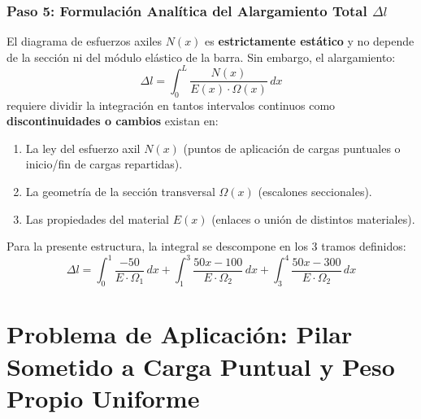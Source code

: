 \subsubsection*{Paso 5: Formulación Analítica del Alargamiento Total $\Delta l$}
\begin{ImportanteBox}[title={Regla Fundamental: Segmentación de la Integral de Deformación}]
    El diagrama de esfuerzos axiles $N(x)$ es \textbf{estrictamente estático} y no depende de la sección ni del módulo elástico de la barra. Sin embargo, el alargamiento:
    \begin{equation}
        \Delta l = \int_0^L \frac{N(x)}{E(x) \cdot \Omega(x)} \, dx
    \end{equation}
    requiere dividir la integración en tantos intervalos continuos como \textbf{discontinuidades o cambios} existan en:
    \begin{enumerate}
        \item La ley del esfuerzo axil $N(x)$ (puntos de aplicación de cargas puntuales o inicio/fin de cargas repartidas).
        \item La geometría de la sección transversal $\Omega(x)$ (escalones seccionales).
        \item Las propiedades del material $E(x)$ (enlaces o unión de distintos materiales).
    \end{enumerate}
\end{ImportanteBox}

Para la presente estructura, la integral se descompone en los 3 tramos definidos:
\begin{equation}
    \Delta l = \int_0^1 \frac{-50}{E \cdot \Omega_1} \, dx + \int_1^3 \frac{50x - 100}{E \cdot \Omega_2} \, dx + \int_3^4 \frac{50x - 300}{E \cdot \Omega_2} \, dx
\end{equation}

\section{Problema de Aplicación: Pilar Sometido a Carga Puntual y Peso Propio Uniforme}

